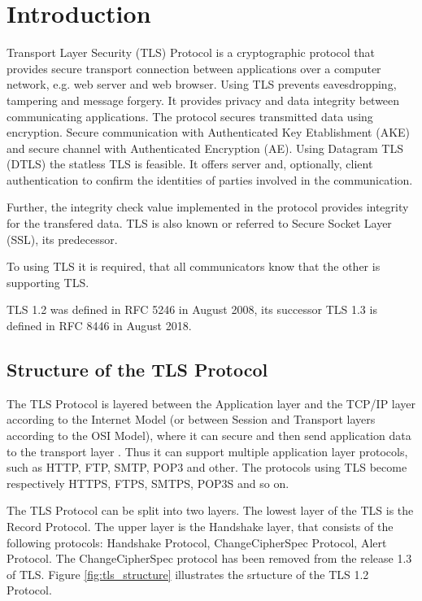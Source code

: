 \chapter{Introduction}
\label{chap:introduction}

Transport Layer Security (TLS) Protocol is a cryptographic protocol that provides secure transport connection between applications over a computer network, e.g. web server and web browser. 
 Using TLS prevents eavesdropping, tampering and message forgery. It provides privacy and data integrity between communicating applications. The protocol secures transmitted data using encryption. Secure communication with Authenticated Key Etablishment (AKE) and secure channel with Authenticated Encryption (AE). 
 Using Datagram TLS (DTLS) the statless TLS is feasible. It offers server and, optionally, client authentication to confirm the identities of parties involved in the communication. 
 
 Further, the integrity check value implemented in the protocol provides integrity for the transfered data. TLS is also known or referred to Secure Socket Layer (SSL), its predecessor. 
 
To using TLS it is required, that all communicators know that the other is supporting TLS.

TLS 1.2 was defined in RFC 5246 in August 2008, its successor TLS 1.3 is defined in RFC 8446 in August 2018.
 \cite{RFC5246}

\section{Structure of the TLS Protocol}
\label{sec:stucture}

The TLS Protocol is layered between the Application layer and the TCP/IP layer according to the Internet Model (or between Session and Transport layers according to the OSI Model), where it can secure and then send application data to the transport layer \cite{ms:overview}. Thus it can support multiple application layer protocols, such as HTTP, FTP, SMTP, POP3 and other. The protocols using TLS become respectively HTTPS, FTPS, SMTPS, POP3S and so on.

The TLS Protocol can be split into two layers. The lowest layer of the TLS is the Record Protocol. The upper layer is the Handshake layer, that consists of the following protocols: Handshake Protocol, ChangeCipherSpec Protocol, Alert Protocol. The ChangeCipherSpec protocol has been removed from the release 1.3 of TLS. Figure \ref{fig:tls_structure} illustrates the srtucture of the TLS 1.2 Protocol. 


